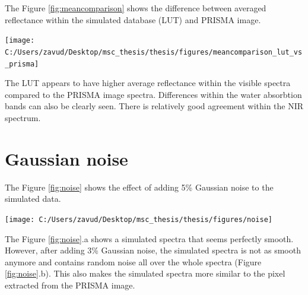 \documentclass[a4paper, nobind]{templates/ociamthesis}
\let\origfigure\figure
\let\endorigfigure\endfigure
\renewenvironment{figure}[1][2] {
    \expandafter\origfigure\expandafter[H]
} {
    \endorigfigure
}
\begin{document}
The Figure \ref{fig:meancomparison} shows the difference between averaged reflectance within the simulated database (LUT) and PRISMA image.

\begin{figure}

{\centering \texttt{[image: C:/Users/zavud/Desktop/msc\_thesis/thesis/figures/meancomparison\_lut\_vs\_prisma]} 

}

\caption{Difference between averaged LUT and PRISMA image reflectance}\label{fig:meancomparison}
\end{figure}

The LUT appears to have higher average reflectance within the visible spectra compared to the PRISMA image spectra. Differences within the water absorbtion bands can also be clearly seen. There is relatively good agreement within the NIR spectrum.

\newpage

\hypertarget{gaussian-noise-1}{%
\section{Gaussian noise}\label{gaussian-noise-1}}

The Figure \ref{fig:noise} shows the effect of adding 5\% Gaussian noise to the simulated data.

\begin{figure}
\texttt{[image: C:/Users/zavud/Desktop/msc\_thesis/thesis/figures/noise]} \caption{Effect of adding $3\%$ Gaussian noise to the simulated spectra. The randomly chosen pixel from the PRISMA data was plotted to illustrate the noise found typically in the image}\label{fig:noise}
\end{figure}

The Figure \ref{fig:noise}.a shows a simulated spectra that seems perfectly smooth. However, after adding 3\% Gaussian noise, the simulated spectra is not as smooth anymore and contains random noise all over the whole spectra (Figure \ref{fig:noise}.b). This also makes the simulated spectra more similar to the pixel extracted from the PRISMA image.






\end{document}
